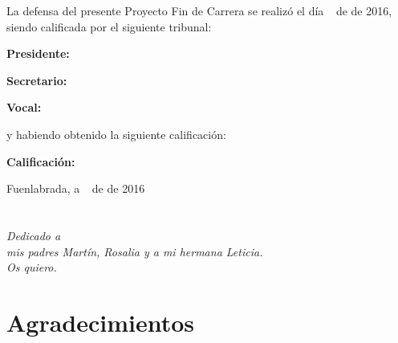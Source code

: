 \documentclass[a4paper, 12pt]{book}
\begin{document}
\vspace{1cm}
La defensa del presente Proyecto Fin de Carrera se realizó el día \qquad$\;\,$ de \qquad\qquad\qquad\qquad \newline de 2016, siendo calificada por el siguiente tribunal:


\vspace{0.5cm}
\textbf{Presidente:}

\vspace{1.2cm}
\textbf{Secretario:}

\vspace{1.2cm}
\textbf{Vocal:}


\vspace{1.2cm}
y habiendo obtenido la siguiente calificación:

\vspace{1cm}
\textbf{Calificación:}


\vspace{1cm}
\begin{flushright}
Fuenlabrada, a \qquad$\;\,$ de \qquad\qquad\qquad\qquad de 2016
\end{flushright}


\chapter*{}
\begin{flushright}
\textit{Dedicado a \\
mis padres Martín, Rosalia y a mi hermana Leticia.\\
Os quiero.}
\end{flushright}


\chapter*{Agradecimientos}
\end{document}

